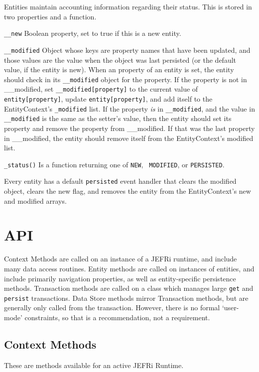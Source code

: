 \documentclass{article}
\newcommand{\ilcode}{\tt}
\begin{document}
Entities maintain accounting information regarding their status. This is stored
in two properties and a function.

{\ilcode \_\_new} Boolean property, set to true if this is a new entity.

{\ilcode \_\_modified} Object whose keys are property names that have been
updated, and those values are the value when the object was last persisted (or
the default value, if the entity is new). When an property of an entity is set,
the entity should check in its {\ilcode \_\_modified} object for the property. If the
property is not in \_\_modified, set {\ilcode \_\_modified[property]} to the current value
of {\ilcode entity[property]}, update {\ilcode entity[property]}, and add itself to the
EntityContext's {\ilcode \_modified} list. If the property {\it  is} in {\ilcode \_\_modified}, and
the value in {\ilcode \_\_modified} is the same as the setter's value, then the entity
should set its property and remove the property from \_\_modified. If that was
the last property in \_\_modified, the entity should remove itself from the
EntityContext's modified list.

{\ilcode \_status()} Is a function returning one of {\ilcode NEW}, {\ilcode
MODIFIED}, or {\ilcode PERSISTED}.

Every entity has a default {\ilcode persisted} event handler that clears the
modified object, clears the new flag, and removes the entity from the
EntityContext's new and modified arrays.

\section{API}
Context Methods are called on an instance of a JEFRi runtime, and include many
data access routines. Entity methods are called on instances of entities, and
include primarily navigation properties, as well as entity-specific persistence
methods. Transaction methods are called on a class which manages large {\ilcode get} and
{\ilcode persist} transactions. Data Store methods mirror Transaction methods, but
are generally only called from the transaction. However, there is no formal
`user-mode' constraints, so that is a recommendation, not a requirement.

\subsection{Context Methods}
These are methods available for an active JEFRi Runtime.
\end{document}
